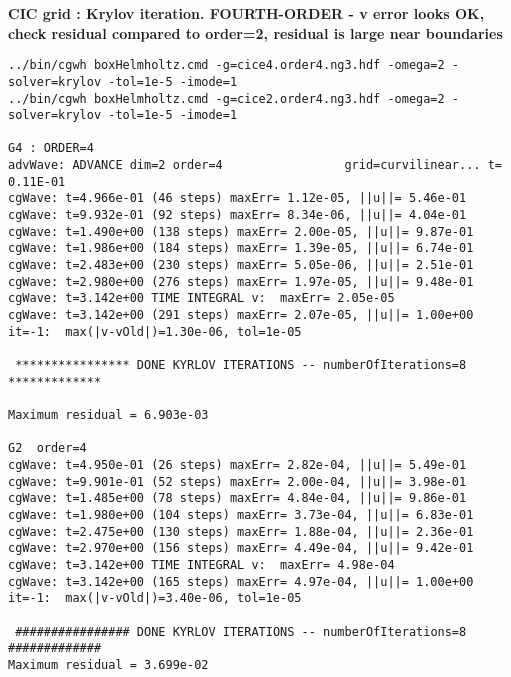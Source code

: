 \bigskip
\textbf{CIC grid  : Krylov iteration. FOURTH-ORDER  - v error looks OK, check residual compared to order=2, residual
is large near boundaries}
\begin{Verbatim}[fontsize=\scriptsize]
../bin/cgwh boxHelmholtz.cmd -g=cice4.order4.ng3.hdf -omega=2 -solver=krylov -tol=1e-5 -imode=1
../bin/cgwh boxHelmholtz.cmd -g=cice2.order4.ng3.hdf -omega=2 -solver=krylov -tol=1e-5 -imode=1

G4 : ORDER=4
advWave: ADVANCE dim=2 order=4                 grid=curvilinear... t=  0.11E-01
cgWave: t=4.966e-01 (46 steps) maxErr= 1.12e-05, ||u||= 5.46e-01 
cgWave: t=9.932e-01 (92 steps) maxErr= 8.34e-06, ||u||= 4.04e-01 
cgWave: t=1.490e+00 (138 steps) maxErr= 2.00e-05, ||u||= 9.87e-01 
cgWave: t=1.986e+00 (184 steps) maxErr= 1.39e-05, ||u||= 6.74e-01 
cgWave: t=2.483e+00 (230 steps) maxErr= 5.05e-06, ||u||= 2.51e-01 
cgWave: t=2.980e+00 (276 steps) maxErr= 1.97e-05, ||u||= 9.48e-01 
cgWave: t=3.142e+00 TIME INTEGRAL v:  maxErr= 2.05e-05
cgWave: t=3.142e+00 (291 steps) maxErr= 2.07e-05, ||u||= 1.00e+00 
it=-1:  max(|v-vOld|)=1.30e-06, tol=1e-05

 **************** DONE KYRLOV ITERATIONS -- numberOfIterations=8 *************

Maximum residual = 6.903e-03

G2  order=4
cgWave: t=4.950e-01 (26 steps) maxErr= 2.82e-04, ||u||= 5.49e-01 
cgWave: t=9.901e-01 (52 steps) maxErr= 2.00e-04, ||u||= 3.98e-01 
cgWave: t=1.485e+00 (78 steps) maxErr= 4.84e-04, ||u||= 9.86e-01 
cgWave: t=1.980e+00 (104 steps) maxErr= 3.73e-04, ||u||= 6.83e-01 
cgWave: t=2.475e+00 (130 steps) maxErr= 1.88e-04, ||u||= 2.36e-01 
cgWave: t=2.970e+00 (156 steps) maxErr= 4.49e-04, ||u||= 9.42e-01 
cgWave: t=3.142e+00 TIME INTEGRAL v:  maxErr= 4.98e-04
cgWave: t=3.142e+00 (165 steps) maxErr= 4.97e-04, ||u||= 1.00e+00 
it=-1:  max(|v-vOld|)=3.40e-06, tol=1e-05

 ################ DONE KYRLOV ITERATIONS -- numberOfIterations=8 #############
Maximum residual = 3.699e-02
\end{Verbatim}


